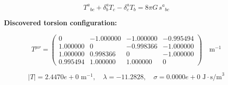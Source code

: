 
\begin{equation}
  T^a{}_{bc} + \delta^a_b T_c - \delta^a_c T_b = 8\pi G \, s^a{}_{bc}
\end{equation}

\textbf{Discovered torsion configuration:}

\begin{equation}
  T^{\mu\nu} = \begin{pmatrix}
    0 & -1.000000 & -1.000000 & -0.995494 \\
    1.000000 & 0 & -0.998366 & -1.000000 \\
    1.000000 & 0.998366 & 0 & -1.000000 \\
    0.995494 & 1.000000 & 1.000000 & 0
  \end{pmatrix} \quad \text{m}^{-1}
\end{equation}

\begin{equation}
  |T| = 2.4470e+0 \text{ m}^{-1}, \quad
  \lambda = -11.2828, \quad
  \sigma = 0.0000e+0 \text{ J}\cdot\text{s/m}^3
\end{equation}